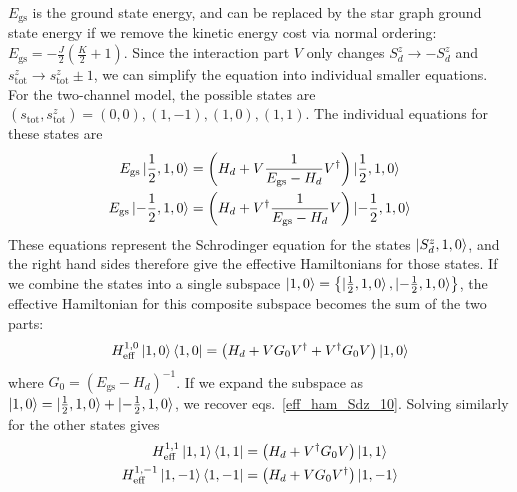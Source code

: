 \documentclass[reprint,prb,superscriptaddress]{revtex4-2}
\begin{document}
\(E_\text{gs}\) is the ground state energy, and can be replaced by the star graph ground state energy if we remove the kinetic energy cost via normal ordering: \(E_\text{gs} = -\frac{J}{2}\left(\frac{K}{2}+1\right) \). Since the interaction part \(V\) only changes \(S_d^z \to -S_d^z\) and \(s^z_\text{tot} \to s^z_\text{tot} \pm 1\), we can simplify the equation into individual smaller equations. For the two-channel model, the possible states are \((s_\text{tot},s^z_\text{tot}) = (0,0), (1,-1), (1,0), (1,1)\). The individual equations for these states are
\begin{align}
	\label{eff_ham_Sdz_10}
	E_\text{gs} \ket{\frac{1}{2}, 1, 0} &= \left(H_d + V \frac{1}{E_\text{gs} - H_d}V^\dagger\right) \ket{\frac{1}{2}, 1, 0}\\
	E_\text{gs} \ket{-\frac{1}{2}, 1, 0} &= \left(H_d + V^\dagger \frac{1}{E_\text{gs} - H_d} V\right) \ket{-\frac{1}{2}, 1, 0}\\
\end{align}
These equations represent the Schrodinger equation for the states \(\ket{S_d^z, 1, 0}\), and the right hand sides therefore give the effective Hamiltonians for those states. If we combine the states into a single subspace \(\ket{1,0}= \left\{\ket{\frac{1}{2}, 1, 0}, \ket{-\frac{1}{2}, 1, 0}\right\}\), the effective Hamiltonian for this composite subspace becomes the sum of the two parts:
\begin{align}
	\label{eff_ham_10}
	H^{1,0}_\text{eff}\ket{1, 0}\bra{1, 0} = \left(H_d + V G_0 V^\dagger + V^\dagger G_0  V\right) \ket{1, 0}
\end{align}
where \(G_0 = \left(E_\text{gs} - H_d\right)^{-1}\). If we expand the subspace as \(\ket{1,0} = \ket{\frac{1}{2}, 1, 0} + \ket{-\frac{1}{2}, 1, 0}\), we recover eqs.~\ref{eff_ham_Sdz_10}. Solving similarly for the other states gives
\begin{align}
	H^{1,1}_\text{eff}\ket{1,  1}\bra{1,  1} &= \left(H_d + V^\dagger G_0  V\right) \ket{1,  1}\\
	H^{1,-1}_\text{eff}\ket{1, - 1}\bra{1, - 1} &= \left(H_d + V G_0 V^\dagger\right) \ket{1, - 1}
\end{align}
\end{document}
